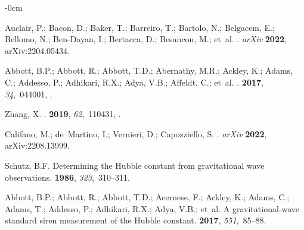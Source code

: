 \documentclass[universe,article,accept,moreauthors,pdftex]{Definitions/mdpi}
\begin{document}
\begin{adjustwidth}{-\extralength}{0cm}
\begin{thebibliography}{999}
Auclair, P.; Bacon, D.; Baker, T.; Barreiro, T.; Bartolo, N.; Belgacem, E.; Bellomo, N.; Ben-Dayan, I.; Bertacca, D.; Besancon, M.;  et~al.
. \emph{arXiv} {\bf 2022}, arXiv:2204.05434. 

Abbott, B.P.; Abbott, R.; Abbott, T.D.; Abernathy, M.R.; Ackley, K.; Adams, C.; Addesso, P.; Adhikari, R.X.; Adya, V.B.; Affeldt, C.;  et~al.
.
 {\bf 2017}, {\em 34},~044001,
{\href{https://doi.org/10.1088/1361-6382/aa51f4}{}}.

Zhang, X.
.
 {\bf 2019}, {\em 62},~110431,
{\href{https://doi.org/10.1007/s11433-019-9445-7}{}}.

Califano, M.; de~Martino, I.; Vernieri, D.; Capozziello, S.
.\emph{ arXiv} {\bf
  2022}, arXiv:2208.13999. 

Schutz, B.F.
\newblock Determining the Hubble constant from gravitational wave observations.
 {\bf 1986}, {\em 323},~310--311.

Abbott, B.P.; Abbott, R.; Abbott, T.D.; Acernese, F.; Ackley, K.; Adams, C.; Adams, T.; Addesso, P.; Adhikari, R.X.; Adya, V.B.;  et~al.
\newblock A gravitational-wave standard siren measurement of the Hubble
  constant.
 {\bf 2017}, {\em 551},~85--88.


\end{thebibliography}
\end{adjustwidth}
\end{document}
